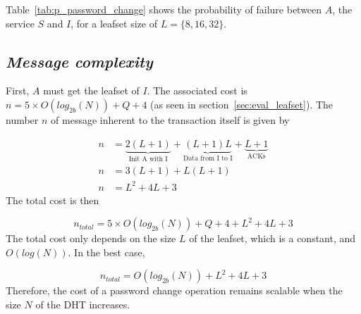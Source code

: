     Table~\eqref{tab:p_password_change} shows the probability of failure
between $A$, the service $S$ and $I$, for a leafset size of $L = \{8,16,32\}$.

  \subsection{\textit{Message complexity}}
    First, $A$ must get the leafset of $I$. The associated cost is $n = 5
\times O(log_{2b}(N)) + Q + 4$ (as seen in section~\ref{sec:eval_leafset}).
    The number $n$ of message inherent to the transaction itself is given by

    \begin{align}
      n &= \underbrace{2(L+1)}_\text{Init A with I} +
           \underbrace{(L+1)L}_\text{Data from I to I} +
           \underbrace{L+1}_\text{ACKs}\\
      n &= 3(L+1) + L(L+1)\\
      n &= L^2 + 4L + 3
    \end{align}
     The total cost is then

    $$
      n_{total} = 5 \times O(log_{2b}(N)) + Q + 4 +  L^2 + 4L + 3
    $$    
    The total cost only depends on the size $L$ of the leafset, which is a
constant, and $O(log(N))$. In the best case, 

    $$
      n_{total} = O(log_{2b}(N)) + L^2 + 4L + 3
    $$
    Therefore, the cost of a password change operation remains
scalable when the size $N$ of the DHT increases.

